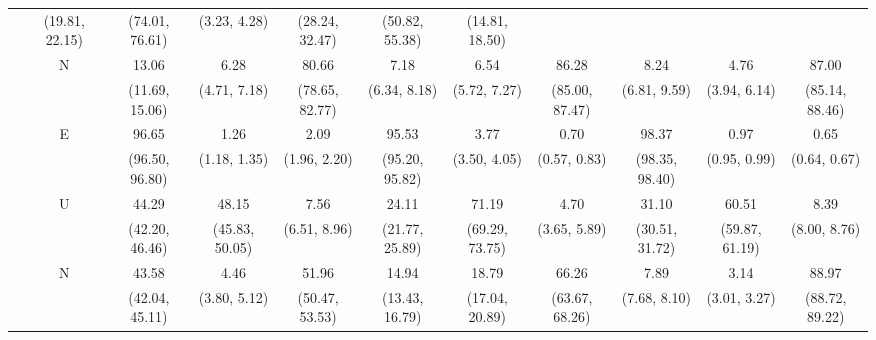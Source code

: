 {\begin{tabular}{>{\centering}m{}c|ccc|ccc|ccc}
& {\scriptsize (19.81, 22.15)} & {\scriptsize (74.01, 76.61)} & {\scriptsize (3.23, 4.28)}
& {\scriptsize (28.24, 32.47)} & {\scriptsize (50.82, 55.38)} & {\scriptsize (14.81, 18.50)}
\\ [0.1cm]
& \multirow{2}{*}{N}
& 13.06 & 6.28 & 80.66 & 7.18 & 6.54 & 86.28 & 8.24 & 4.76 & 87.00 \\ [-0.1cm] &
& {\scriptsize (11.69, 15.06)} & {\scriptsize (4.71, 7.18)} & {\scriptsize (78.65, 82.77)}
& {\scriptsize (6.34, 8.18)} & {\scriptsize (5.72, 7.27)} & {\scriptsize (85.00, 87.47)}
& {\scriptsize (6.81, 9.59)} & {\scriptsize (3.94, 6.14)} & {\scriptsize (85.14, 88.46)}
\\ [0.1cm]
\hline
\multirow{6}{0.1\textwidth}{\centering Wife Non-participant}
& \multirow{2}{*}{E}
& 96.65 & 1.26 & 2.09 & 95.53 & 3.77 & 0.70 & 98.37 & 0.97 & 0.65 \\ [-0.1cm] &
& {\scriptsize (96.50, 96.80)} & {\scriptsize (1.18, 1.35)} & {\scriptsize (1.96, 2.20)}
& {\scriptsize (95.20, 95.82)} & {\scriptsize (3.50, 4.05)} & {\scriptsize (0.57, 0.83)}
& {\scriptsize (98.35, 98.40)} & {\scriptsize (0.95, 0.99)} & {\scriptsize (0.64, 0.67)}
\\ [0.1cm]
& \multirow{2}{*}{U}
& 44.29 & 48.15 & 7.56 & 24.11 & 71.19 & 4.70 & 31.10 & 60.51 & 8.39 \\ [-0.1cm] &
& {\scriptsize (42.20, 46.46)} & {\scriptsize (45.83, 50.05)} & {\scriptsize (6.51, 8.96)}
& {\scriptsize (21.77, 25.89)} & {\scriptsize (69.29, 73.75)} & {\scriptsize (3.65, 5.89)}
& {\scriptsize (30.51, 31.72)} & {\scriptsize (59.87, 61.19)} & {\scriptsize (8.00, 8.76)}
\\ [0.1cm]
& \multirow{2}{*}{N}
& 43.58 & 4.46 & 51.96 & 14.94 & 18.79 & 66.26 & 7.89 & 3.14 & 88.97 \\ [-0.1cm] &
& {\scriptsize (42.04, 45.11)} & {\scriptsize (3.80, 5.12)} & {\scriptsize (50.47, 53.53)}
& {\scriptsize (13.43, 16.79)} & {\scriptsize (17.04, 20.89)} & {\scriptsize (63.67, 68.26)}
& {\scriptsize (7.68, 8.10)} & {\scriptsize (3.01, 3.27)} & {\scriptsize (88.72, 89.22)}
\\ [0.1cm]
\hline
\hline
\end{tabular}
}
